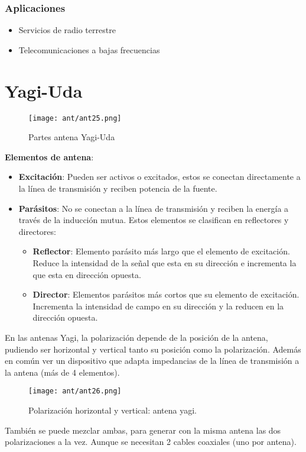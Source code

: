 \documentclass[
	12pt, %
	fleqn, %
	a4paper, %
	oneside, %
]{LegrandOrangeBook}
\begin{document}
\subsubsection{Aplicaciones}
\begin{itemize}
\item Servicios de radio terrestre
\item Telecomunicaciones a bajas frecuencias
\end{itemize}
\section{Yagi-Uda}
\begin{figure}[H]
\centering
\texttt{[image: ant/ant25.png]}
\caption{Partes antena Yagi-Uda}
\end{figure}
\textbf{Elementos de antena}:
\begin{itemize}
\item \textbf{Excitación}: Pueden ser activos o excitados, estos se conectan directamente a la línea de transmisión y reciben potencia de la fuente.
\item \textbf{Parásitos}: No se conectan a la línea de transmisión y reciben la energía a través de la inducción mutua. Estos elementos se clasifican en reflectores y directores:
\begin{itemize}
\item \textbf{Reflector}: Elemento parásito más largo que el elemento de excitación. Reduce la intensidad de la señal que esta en su dirección e incrementa la que esta en dirección opuesta.
\item \textbf{Director}: Elementos parásitos más cortos que su elemento de excitación. Incrementa la intensidad de campo en su dirección y la reducen en la dirección opuesta.
\end{itemize}
\end{itemize}
En las antenas Yagi, la polarización depende de la posición de la antena, pudiendo ser horizontal y vertical tanto su posición como la polarización. Además en común ver un dispositivo que adapta impedancias de la línea de transmisión a la antena (más de 4 elementos).
\begin{figure}[H]
\centering
\texttt{[image: ant/ant26.png]}
\caption{Polarización horizontal y vertical: antena yagi.}
\end{figure}
También se puede mezclar ambas, para generar con la misma antena las dos polarizaciones a la vez. Aunque se necesitan 2 cables coaxiales (uno por antena).
\end{document}
